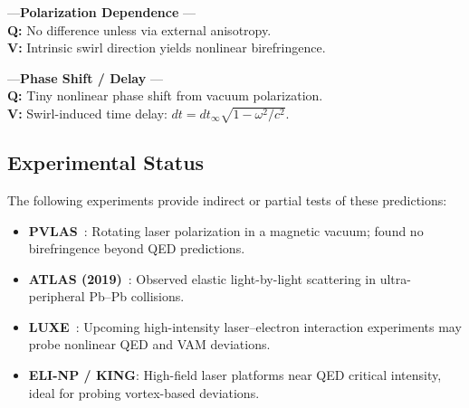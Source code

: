 \begin{footnotesize}
\begin{minipage}{\linewidth}
                         \vspace{3pt}
                         \hspace*{2em}—\textbf{Polarization Dependence} —\\
                         \textbf{Q:} No difference unless via external anisotropy.\\
                         \textbf{V:} Intrinsic swirl direction yields nonlinear birefringence.

                         \vspace{3pt}
                         \hspace*{2em}—\textbf{Phase Shift / Delay} —\\
                         \textbf{Q:} Tiny nonlinear phase shift from vacuum polarization.\\
                         \textbf{V:} Swirl-induced time delay: $dt = dt_\infty \sqrt{1 - \omega^2/c^2}$.
                    \end{minipage}
                \end{footnotesize}


        \subsection{Experimental Status}

                The following experiments provide indirect or partial tests of these predictions:

                \begin{itemize}
                    \item \textbf{PVLAS}~\cite{bregant2008}: Rotating laser polarization in a magnetic vacuum; found no birefringence beyond QED predictions.

                    \item \textbf{ATLAS (2019)}~\cite{atlas2019}: Observed elastic light-by-light scattering in ultra-peripheral Pb–Pb collisions.

                    \item \textbf{LUXE}~\cite{luxe2023}: Upcoming high-intensity laser–electron interaction experiments may probe nonlinear QED and VAM deviations.

                    \item \textbf{ELI-NP / KING}: High-field laser platforms near QED critical intensity, ideal for probing vortex-based deviations.
                \end{itemize}

